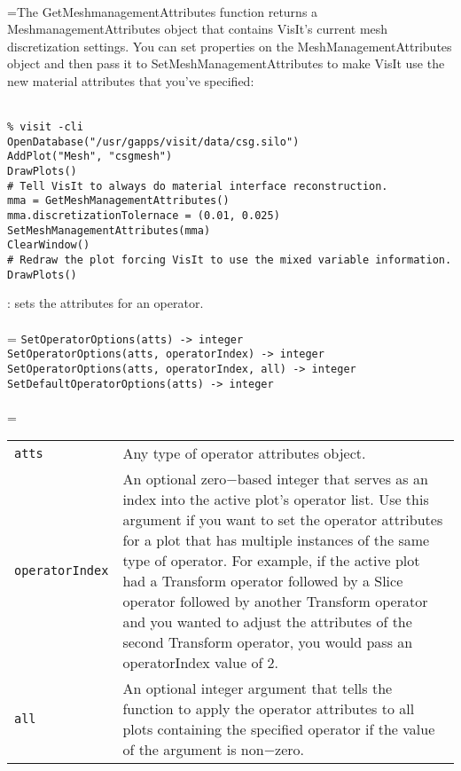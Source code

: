 \documentclass[10pt,a4paper]{report}
\begin{document}
 \\ 
\hangindent=\parindent The GetMeshmanagementAttributes function returns a MeshmanagementAttributes object that contains VisIt's current mesh discretization settings. You can set properties on the MeshManagementAttributes object and then pass it to SetMeshManagementAttributes to make VisIt use the new material attributes that you've specified: \\[-3mm] 

\\[-6mm]
\begin{verbatim}% visit -cli
OpenDatabase("/usr/gapps/visit/data/csg.silo")
AddPlot("Mesh", "csgmesh")
DrawPlots()
# Tell VisIt to always do material interface reconstruction.
mma = GetMeshManagementAttributes()
mma.discretizationTolernace = (0.01, 0.025)
SetMeshManagementAttributes(mma)
ClearWindow()
# Redraw the plot forcing VisIt to use the mixed variable information.
DrawPlots()
\end{verbatim}
\newpage


{}
: sets the attributes for an operator.\\[-3mm]

 \\ 
\hangindent=\parindent 
\verb!SetOperatorOptions(atts) -> integer!\\ 
\verb!SetOperatorOptions(atts, operatorIndex) -> integer!\\ 
\verb!SetOperatorOptions(atts, operatorIndex, all) -> integer!\\ 
\verb!SetDefaultOperatorOptions(atts) -> integer!\\ [-3mm]

 \\ 
\hangindent=\parindent 
\begin{tabular}{lp{9cm}}
\verb!atts! & Any type of operator attributes object. \\
\verb!operatorIndex! & An optional zero$-$based integer that serves as an index into the active plot's operator list. Use this argument if you want to set the operator attributes for a plot that has multiple instances of the same type of operator. For example, if the active plot had a Transform operator followed by a Slice operator followed by another Transform operator and you wanted to adjust the attributes of the second Transform operator, you would pass an operatorIndex value of 2. \\
\verb!all! & An optional integer argument that tells the function to apply the operator attributes to all plots containing the specified operator if the value of the argument is non$-$zero. \\
\end{tabular} \\[-2mm]
\end{document}
